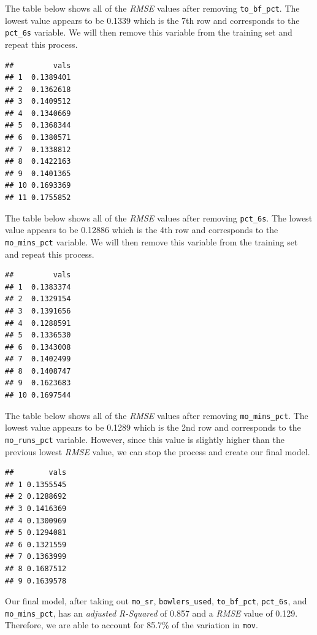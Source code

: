 \documentclass[
]{article}
\begin{document}
The table below shows all of the \emph{RMSE} values after removing
\texttt{to\_bf\_pct}. The lowest value appears to be 0.1339 which is the
7th row and corresponds to the \texttt{pct\_6s} variable. We will then
remove this variable from the training set and repeat this process.

\begin{verbatim}
##         vals
## 1  0.1389401
## 2  0.1362618
## 3  0.1409512
## 4  0.1340669
## 5  0.1368344
## 6  0.1380571
## 7  0.1338812
## 8  0.1422163
## 9  0.1401365
## 10 0.1693369
## 11 0.1755852
\end{verbatim}

The table below shows all of the \emph{RMSE} values after removing
\texttt{pct\_6s}. The lowest value appears to be 0.12886 which is the
4th row and corresponds to the \texttt{mo\_mins\_pct} variable. We will
then remove this variable from the training set and repeat this process.

\begin{verbatim}
##         vals
## 1  0.1383374
## 2  0.1329154
## 3  0.1391656
## 4  0.1288591
## 5  0.1336530
## 6  0.1343008
## 7  0.1402499
## 8  0.1408747
## 9  0.1623683
## 10 0.1697544
\end{verbatim}

The table below shows all of the \emph{RMSE} values after removing
\texttt{mo\_mins\_pct}. The lowest value appears to be 0.1289 which is
the 2nd row and corresponds to the \texttt{mo\_runs\_pct} variable.
However, since this value is slightly higher than the previous lowest
\emph{RMSE} value, we can stop the process and create our final model.

\begin{verbatim}
##        vals
## 1 0.1355545
## 2 0.1288692
## 3 0.1416369
## 4 0.1300969
## 5 0.1294081
## 6 0.1321559
## 7 0.1363999
## 8 0.1687512
## 9 0.1639578
\end{verbatim}

Our final model, after taking out \texttt{mo\_sr},
\texttt{bowlers\_used}, \texttt{to\_bf\_pct}, \texttt{pct\_6s}, and
\texttt{mo\_mins\_pct}, has an \emph{adjusted R-Squared} of 0.857 and a
\emph{RMSE} value of 0.129. Therefore, we are able to account for 85.7\%
of the variation in \texttt{mov}.
\end{document}
